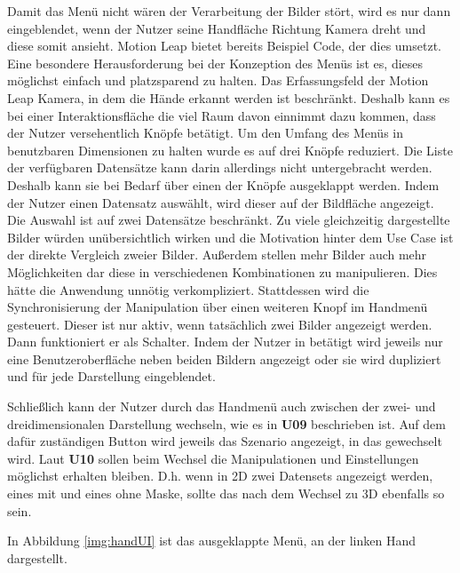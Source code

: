 Damit das Menü nicht wären der Verarbeitung der Bilder stört, wird es nur dann eingeblendet, wenn der Nutzer seine Handfläche Richtung Kamera dreht und diese somit ansieht. Motion Leap bietet bereits Beispiel Code, der dies umsetzt.
Eine besondere Herausforderung bei der Konzeption des Menüs ist es, dieses möglichst einfach und platzsparend zu halten. Das Erfassungsfeld der Motion Leap Kamera, in dem die Hände erkannt werden ist beschränkt. Deshalb kann es bei einer Interaktionsfläche die viel Raum davon einnimmt dazu kommen, dass der Nutzer versehentlich Knöpfe betätigt. 
Um den Umfang des Menüs in benutzbaren Dimensionen zu halten wurde es auf drei Knöpfe reduziert. 
Die Liste der verfügbaren Datensätze kann darin allerdings nicht untergebracht werden. Deshalb kann sie bei Bedarf über einen der Knöpfe ausgeklappt werden. 
Indem der Nutzer einen Datensatz auswählt, wird dieser auf der Bildfläche angezeigt. Die Auswahl ist auf zwei Datensätze beschränkt. Zu viele gleichzeitig dargestellte Bilder würden unübersichtlich wirken und die Motivation hinter dem Use Case ist der direkte Vergleich zweier Bilder. Außerdem stellen mehr Bilder auch mehr Möglichkeiten dar diese in verschiedenen Kombinationen zu manipulieren. Dies hätte die Anwendung unnötig verkompliziert. 
Stattdessen wird die Synchronisierung der Manipulation über einen weiteren Knopf im Handmenü gesteuert. Dieser ist nur aktiv, wenn tatsächlich zwei Bilder angezeigt werden. Dann funktioniert er als Schalter. Indem der Nutzer in betätigt wird jeweils nur eine Benutzeroberfläche neben beiden Bildern angezeigt oder sie wird dupliziert und für jede Darstellung eingeblendet. 
 
Schließlich kann der Nutzer durch das Handmenü auch zwischen der zwei- und dreidimensionalen Darstellung wechseln, wie es in \textbf{U09} beschrieben ist. Auf dem dafür zuständigen Button wird jeweils das Szenario angezeigt, in das gewechselt wird.
Laut \textbf{U10} sollen beim Wechsel die Manipulationen und Einstellungen möglichst erhalten bleiben. D.h. wenn in 2D zwei Datensets angezeigt werden, eines mit und eines ohne Maske, sollte das nach dem Wechsel zu 3D ebenfalls so sein. 

In Abbildung \ref{img:handUI} ist das ausgeklappte Menü, an der linken Hand dargestellt.

